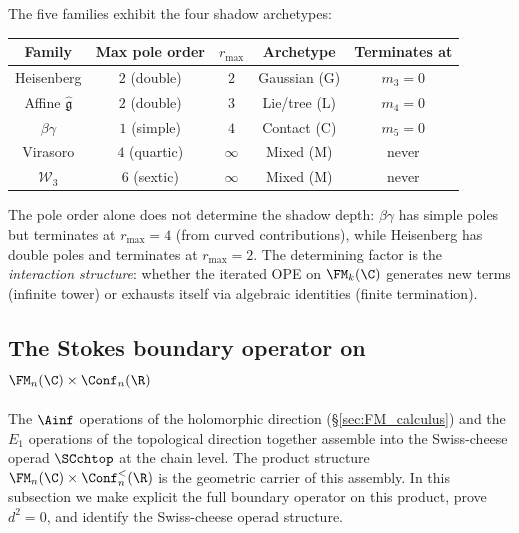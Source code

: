 \begin{remark}
The five families exhibit the four shadow archetypes:
\begin{center}
\renewcommand{\arraystretch}{1.2}
\begin{tabular}{c|c|c|c|c}
\textbf{Family} & \textbf{Max pole order}
 & $r_{\max}$ & \textbf{Archetype}
 & \textbf{Terminates at} \\
\hline
Heisenberg & $2$ (double) & $2$ & Gaussian (G)
 & $m_3 = 0$ \\
Affine $\hat{\mathfrak{g}}$ & $2$ (double)
 & $3$ & Lie/tree (L) & $m_4 = 0$ \\
$\beta\gamma$ & $1$ (simple) & $4$
 & Contact (C) & $m_5 = 0$ \\
Virasoro & $4$ (quartic) & $\infty$
 & Mixed (M) & never \\
$\mathcal{W}_3$ & $6$ (sextic) & $\infty$
 & Mixed (M) & never
\end{tabular}
\end{center}
The pole order alone does not determine the shadow depth:
$\beta\gamma$ has simple poles but terminates at
$r_{\max} = 4$ (from curved contributions), while
Heisenberg has double poles and terminates at
$r_{\max} = 2$. The determining factor is the
\emph{interaction structure}: whether the iterated OPE
on $\FM_k(\C)$ generates new terms (infinite tower) or
exhausts itself via algebraic identities (finite
termination).
\end{remark}



\subsection{The Stokes boundary operator on
$\FM_n(\C) \times \Conf_n(\R)$}

\noindent
The $\Ainf$ operations of the holomorphic direction
(\S\ref{sec:FM_calculus}) and the $E_1$ operations of the
topological direction together assemble into the
Swiss-cheese operad $\SCchtop$ at the chain level. The
product structure
$\FM_n(\C) \times \Conf_n^<(\R)$ is the geometric
carrier of this assembly. In this subsection we
make explicit the full boundary operator on this
product, prove $d^2 = 0$, and identify the Swiss-cheese
operad structure.

